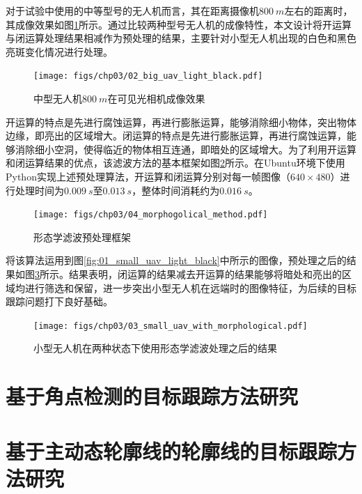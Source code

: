 对于试验中使用的中等型号的无人机而言，其在距离摄像机$800\ m$左右的距离时，其成像效果如图\ref{fig:02_big_uav_light_black}所示。通过比较两种型号无人机的成像特性，本文设计将开运算与闭运算处理结果相减作为预处理的结果，主要针对小型无人机出现的白色和黑色亮斑变化情况进行处理。

\begin{figure}[htb]   
	\centering
	\texttt{[image: figs/chp03/02\_big\_uav\_light\_black.pdf]}
	\caption{中型无人机$800\ m$在可见光相机成像效果}
	\label{fig:02_big_uav_light_black}
\end{figure}

开运算的特点是先进行腐蚀运算，再进行膨胀运算，能够消除细小物体，突出物体边缘，即亮出的区域增大。闭运算的特点是先进行膨胀运算，再进行腐蚀运算，能够消除细小空洞，使得临近的物体相互连通，即暗处的区域增大。为了利用开运算和闭运算结果的优点，该滤波方法的基本框架如图\ref{fig:04_morphogolical_method}所示。在Ubuntu环境下使用Python实现上述预处理算法，开运算和闭运算分别对每一帧图像（$640 \times 480$）进行处理时间为$0.009\ s$至$0.013\ s$，整体时间消耗约为$0.016\ s$。

\begin{figure}[htb]   
	\centering
	\texttt{[image: figs/chp03/04\_morphogolical\_method.pdf]}
	\caption{形态学滤波预处理框架}
	\label{fig:04_morphogolical_method}
\end{figure}

将该算法运用到图\ref{fig:01_small_uav_light_black}中所示的图像，预处理之后的结果如图\ref{fig:03_small_uav_with_morphological}所示。结果表明，闭运算的结果减去开运算的结果能够将暗处和亮出的区域均进行筛选和保留，进一步突出小型无人机在远端时的图像特征，为后续的目标跟踪问题打下良好基础。

\begin{figure}[htb]   
	\centering
	\texttt{[image: figs/chp03/03\_small\_uav\_with\_morphological.pdf]}
	\caption{小型无人机在两种状态下使用形态学滤波处理之后的结果}
	\label{fig:03_small_uav_with_morphological}
\end{figure}


\section{基于角点检测的目标跟踪方法研究}





\section{基于主动态轮廓线的轮廓线的目标跟踪方法研究}



